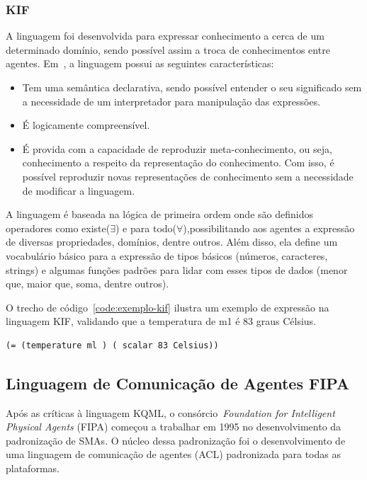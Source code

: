 \subsubsection{KIF}
A linguagem foi desenvolvida para expressar conhecimento a cerca de um determinado domínio, sendo possível assim a troca de conhecimentos entre agentes. Em~\cite{kifmanual}, a linguagem possui as seguintes características:
\begin{itemize}
	\item Tem uma semântica declarativa, sendo possível entender o seu significado sem a necessidade de um interpretador para manipulação das expressões.
	\item É logicamente compreensível.
	\item É provida com a capacidade de reproduzir meta-conhecimento, ou seja, conhecimento a respeito da representação do conhecimento. Com isso, é possível reproduzir novas representações de conhecimento sem a necessidade de modificar a linguagem.
\end{itemize}

A linguagem é baseada na lógica de primeira ordem onde são definidos operadores como existe($\exists$) e para todo($\forall$),possibilitando aos agentes a expressão de diversas propriedades, domínios, dentre outros. Além disso, ela define um vocabulário básico para a expressão de tipos básicos (números, caracteres, strings) e algumas funções padrões para lidar com esses tipos de dados (menor que, maior que, soma, dentre outros). 

O trecho de código~\ref{code:exemplo-kif} ilustra um exemplo de expressão na linguagem KIF, validando que a temperatura de m1 é 83 graus Célsius.

\begin{lstlisting}[label=code:exemplo-kif,caption=Exemplo de expressão de conteúdo com a linguagem KIF. Fonte:~\cite{wooldridge04}]
(= (temperature ml ) ( scalar 83 Celsius))
\end{lstlisting}

\subsection{Linguagem de Comunicação de Agentes FIPA}

Após as críticas à linguagem KQML, o consórcio~\emph{Foundation for Intelligent Physical Agents} (FIPA) começou a trabalhar em 1995 no desenvolvimento da padronização de SMAs. O núcleo dessa padronização foi o desenvolvimento de uma linguagem de comunicação de agentes (ACL) padronizada para todas as plataformas.

